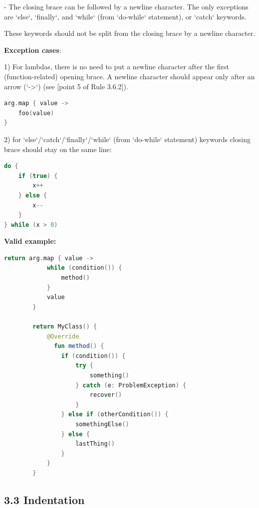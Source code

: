 - The closing brace can be followed by a newline character. The only exceptions are `else`, `finally`, and `while` (from `do-while` statement), or `catch` keywords.

These keywords should not be split from the closing brace by a newline character.



\textbf{Exception cases}: 



1) For lambdas, there is no need to put a newline character after the first (function-related) opening brace. A newline character should appear only after an arrow (`->`) (see [point 5 of Rule 3.6.2]).



\begin{lstlisting}[language=Kotlin]
arg.map { value ->
    foo(value)
}
\end{lstlisting}


2) for `else`/`catch`/`finally`/`while` (from `do-while` statement) keywords closing brace should stay on the same line:

\begin{lstlisting}[language=Kotlin]
do {
    if (true) {
        x++
    } else {
        x--
    }
} while (x > 0) 
\end{lstlisting}
 

\textbf{Valid example:}



\begin{lstlisting}[language=Kotlin]
        return arg.map { value ->
            while (condition()) {
                method()
            }
            value 
        }

        return MyClass() {
            @Override
              fun method() {
                if (condition()) {
                    try {
                        something()
                    } catch (e: ProblemException) {
                        recover()
                    }
                } else if (otherCondition()) {
                    somethingElse()
                } else {
                    lastThing()
                }
            }
        }
\end{lstlisting}


\subsection*{\textbf{3.3 Indentation}}



